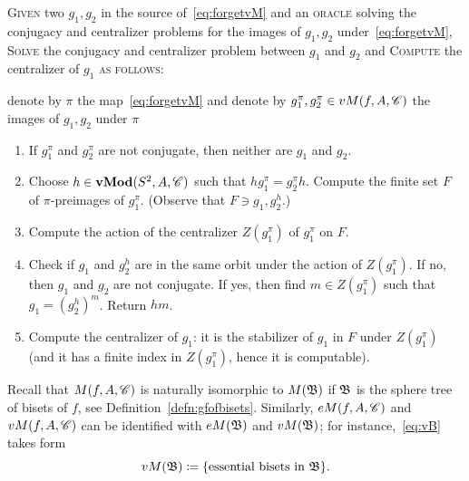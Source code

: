 \documentclass{amsart}
\begin{document}
\begin{algo}
\label{algo:from vM to M:eMod}
 \textsc{Given} two $g_1,g_2$  in the source
  of~\eqref{eq:forgetvM} and an \textsc{oracle} solving the conjugacy and centralizer problems for the images of $g_1,g_2$ under~\eqref{eq:forgetvM}, \textsc{Solve} the conjugacy and centralizer problem between $g_1$ and $g_2$ and \textsc{Compute} the centralizer of $g_1$
   \textsc{as follows:}\upshape
   
   \noindent denote by $\pi$ the map~\eqref{eq:forgetvM} and denote by
  $g_1^\pi,g_2^\pi\in vM(f,A,\CC)$ the images of $g_1,g_2$ under $\pi$
\begin{enumerate}
 \item If $g_1^\pi$ and $g_2^\pi$ are not
  conjugate, then neither are $g_1$ and $g_2$.
  \item Choose $h\in\Mod[v](S^2,A,\CC)$ such that
  $h g_1^\pi=g_2^\pi h $. Compute the finite set $F$ of
  $\pi$-preimages of $g_1^\pi$. (Observe that $F\ni g_1,g_2^h$.)
  \item Compute the action of the centralizer $Z(g_1^\pi)$ of
  $g_1^\pi$ on $F$.
  \item Check if $g_1$ and $g_2^h$ are in the same
  orbit under the action of $Z(g_1^\pi)$. If no, then $g_1$ and $g_2$ are not conjugate. If yes, then find $m\in Z(g_1^\pi)$ such that $g_1=(g_2^h)^m$. Return $hm$. 
\item Compute the centralizer of $g_1$: it is the stabilizer of $g_1$ in $F$ under $Z(g_1^\pi)$ (and it has a
  finite index in $Z(g_1^\pi)$, hence it is computable).
\end{enumerate} 
 \end{algo}

Recall that $M(f, A,\CC)$ is naturally isomorphic to $M(\gfB)$ if
$\gfB$ is the sphere tree of bisets of $f$, see
Definition~\ref{defn:gfofbisets}. Similarly, $eM(f, A,\CC)$ and
$vM(f, A,\CC)$ can be identified with $eM(\gfB)$ and $vM(\gfB)$; for
instance,~\eqref{eq:vB} takes form
\begin{equation}\label{eq:vB as grBis}
  vM(\gfB)\coloneqq\{\text{essential bisets in } \gfB\}.
\end{equation}
\end{document}
